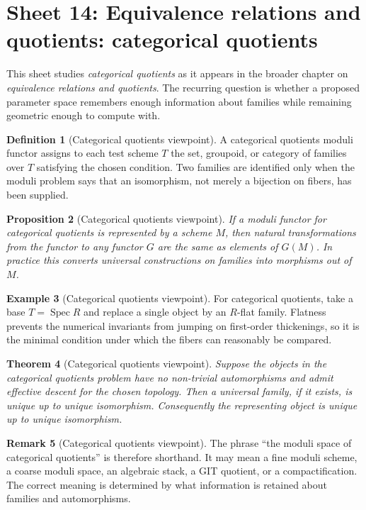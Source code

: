 \documentclass[11pt]{amsart}
\newtheorem{theorem}{Theorem}[section]
\newtheorem{proposition}[theorem]{Proposition}
\theoremstyle{definition}
\newtheorem{definition}[theorem]{Definition}
\newtheorem{example}[theorem]{Example}
\newtheorem{remark}[theorem]{Remark}
\newcommand{\Spec}{\operatorname{Spec}}
\begin{document}
\section{Sheet 14: Equivalence relations and quotients: categorical quotients}
This sheet studies \emph{categorical quotients} as it appears in the broader chapter on \emph{equivalence relations and quotients}.  The recurring question is whether a proposed parameter space remembers enough information about families while remaining geometric enough to compute with.
\begin{definition}[Categorical quotients viewpoint]
A categorical quotients moduli functor assigns to each test scheme $T$ the set, groupoid, or category of families over $T$ satisfying the chosen condition.  Two families are identified only when the moduli problem says that an isomorphism, not merely a bijection on fibers, has been supplied.
\end{definition}
\begin{proposition}[Categorical quotients viewpoint]
If a moduli functor for categorical quotients is represented by a scheme $M$, then natural transformations from the functor to any functor $G$ are the same as elements of $G(M)$.  In practice this converts universal constructions on families into morphisms out of $M$.
\end{proposition}
\begin{example}[Categorical quotients viewpoint]
For categorical quotients, take a base $T=\Spec R$ and replace a single object by an $R$-flat family.  Flatness prevents the numerical invariants from jumping on first-order thickenings, so it is the minimal condition under which the fibers can reasonably be compared.
\end{example}
\begin{theorem}[Categorical quotients viewpoint]
Suppose the objects in the categorical quotients problem have no non-trivial automorphisms and admit effective descent for the chosen topology.  Then a universal family, if it exists, is unique up to unique isomorphism.  Consequently the representing object is unique up to unique isomorphism.
\end{theorem}
\begin{remark}[Categorical quotients viewpoint]
The phrase ``the moduli space of categorical quotients'' is therefore shorthand.  It may mean a fine moduli scheme, a coarse moduli space, an algebraic stack, a GIT quotient, or a compactification.  The correct meaning is determined by what information is retained about families and automorphisms.
\end{remark}
\end{document}
